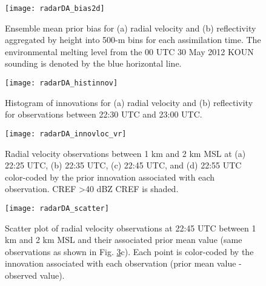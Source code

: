 \begin{figure}
\centering
\texttt{[image: radarDA\_bias2d]}
\caption{Ensemble mean prior bias for (a) radial velocity and (b) reflectivity aggregated by height into 500-m bins for each assimilation time. The environmental melting level from the 00 UTC 30 May 2012 KOUN sounding is denoted by the blue horizontal line.}
\label{bias2d}
\end{figure}
\begin{figure}
\centering
\texttt{[image: radarDA\_histinnov]}
\caption{Histogram of innovations for (a) radial velocity and (b) reflectivity for observations between 22:30 UTC and 23:00 UTC.}
\label{histinnov}
\end{figure}
\begin{figure}
\centering
\texttt{[image: radarDA\_innovloc\_vr]}
\caption{Radial velocity observations between 1 km and 2 km MSL at (a) 22:25 UTC, (b) 22:35 UTC, (c) 22:45 UTC, and (d) 22:55 UTC color-coded by the prior innovation associated with each observation. CREF \textgreater 40 dBZ CREF is shaded.}
\label{innovlocvr}
\end{figure}
\begin{figure}
\centering
\texttt{[image: radarDA\_scatter]}
\caption{Scatter plot of radial velocity observations at 22:45 UTC between 1 km and 2 km MSL and their associated prior mean value (same observations as shown in Fig. \ref{innovlocvr}c). Each point is color-coded by the innovation associated with each observation (prior mean value - observed value).}
\label{scatter}
\end{figure}

